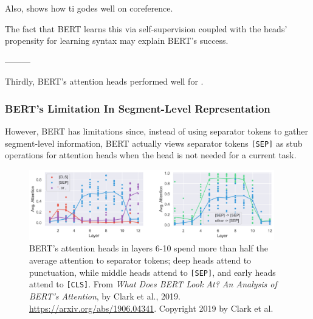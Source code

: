 \begin{figure}
\begin{minipage}{.4\textwidth}
  \label{fig:bertCoref}
\end{minipage}
\end{figure}










Also,  shows how ti godes well on coreference. 


The fact that BERT learns this via self-supervision coupled with the heads' propensity for learning syntax may explain BERT's success. 




---------


Thirdly, BERT's attention heads performed well for . 




\subsubsection{BERT's Limitation In Segment-Level Representation}

However, BERT has limitations since, instead of using separator tokens to gather segment-level information, BERT actually views separator tokens \texttt{[SEP]} as stub operations for attention heads when the head is not needed for a current task. 

\begin{figure}[h]
\vspace{-5pt}
\centering
\includegraphics[width=0.95\textwidth]{imgs/bert_attentionheads_SEP.png}
\vspace{-5pt}
\caption{\footnotesize BERT's attention heads in layers 6-10 spend more than half the average attention to separator tokens; deep heads attend to punctuation, while middle heads attend to \texttt{[SEP]}, and early heads attend to \texttt{[CLS]}. From \emph{What Does BERT Look At? An Analysis of BERT's Attention}, by Clark et al., 2019. \url{https://arxiv.org/abs/1906.04341}. Copyright 2019 by Clark et al.}
\vspace{-5pt}
\label{fig:bertSEPAttention}
\end{figure}

